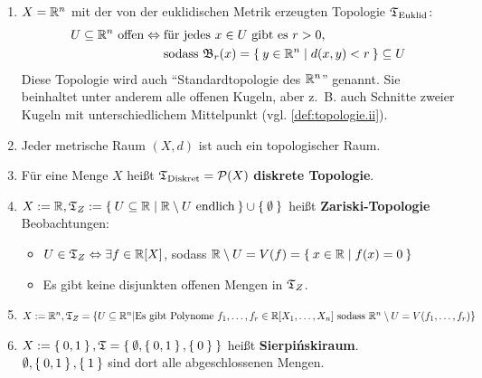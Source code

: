 \begin{beispiel}[Topologien]
    \begin{enumerate}[label=\arabic*)]
        \item $X = \mathbb{R}^n$ mit der von der euklidischen Metrik erzeugten
              Topologie $\mathfrak{T}_{\textnormal{Euklid}}$: 
              \begin{align*}
                U \subseteq \mathbb{R}^n \text{ offen} \Leftrightarrow\;&\text{für jedes $x \in U$ gibt es $r > 0$,}\\
                                                       &\text{sodass $\mathfrak{B}_r(x) = \Set{y \in \ensuremath{\mathbb{R}}^n | d(x,y) < r} \subseteq U$}
              \end{align*}
              Diese Topologie wird auch \enquote{Standardtopologie des $\mathbb{R}^n$} genannt.
              Sie beinhaltet unter anderem alle offenen Kugeln, aber
              z.~B. auch Schnitte zweier Kugeln mit unterschiedlichem
              Mittelpunkt (vgl. \cref{def:topologie.ii}).
        \item Jeder metrische Raum $(X, d)$ ist auch ein topologischer Raum.
        \item Für eine Menge $X$ heißt $\mathfrak{T}_{\textnormal{Diskret}} = \mathcal{P}(X)$ \textbf{diskrete Topologie}.
        \item $X :=\mathbb{R}, \mathfrak{T}_Z := \Set{U \subseteq \ensuremath{\mathbb{R}}| \ensuremath{\mathbb{R}}\setminus U \text{ endlich}} \cup \Set{\emptyset}$ heißt \textbf{Zariski-Topologie} \\
              Beobachtungen: 
            \begin{itemize}
                \item $U \in \mathfrak{T}_Z \Leftrightarrow \exists f \in \mathbb{R}[X]$, sodass $\mathbb{R} \setminus U = V(f) = \Set{x \in \ensuremath{\mathbb{R}}| f(x) = 0}$
                \item Es gibt keine disjunkten offenen Mengen in $\mathfrak{T}_Z$.
            \end{itemize}
        \item $X := \mathbb{R}^n, \mathfrak{T}_Z = \{U \subseteq \mathbb{R}^n | \text{Es gibt Polynome } f_1, \dots, f_r \in \mathbb{R}[X_1, \dots, X_n] \text{ sodass }\\\mathbb{R}^n \setminus U = V(f_1, \dots, f_r)\}$
        \item $X := \Set{0,1}, \mathfrak{T} = \Set{\emptyset, \Set{0,1}, \Set{0}}$ heißt \textbf{Sierpińskiraum}.\\
              $\emptyset, \Set{0,1}, \Set{1}$ sind dort alle abgeschlossenen Mengen.
    \end{enumerate}
\end{beispiel}

